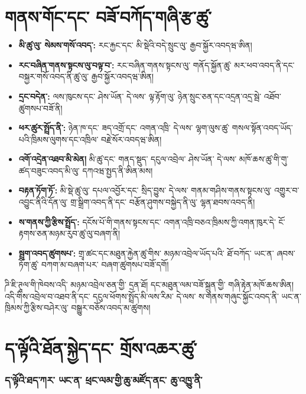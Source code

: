 \documentclass[11pt]{article}
\begin{document}
\section*{གནས་གོང་དང་ བཟོ་བཀོད་གཞི་རྩ་ཚུ་}

\begin{itemize}[leftmargin=*]
\item \textbf{མི་ཚུ་ལུ་ སེམས་གསོ་འབད་:} རང་རྐྱང་དང་ མི་སྡེའི་བདེ་སྲུང་ལུ་ རྒྱབ་སྐྱོར་འབདཝ་ཨིན།
\item \textbf{རང་བཞིན་གནས་སྟངས་ལུ་བལྟ་བ་:} རང་བཞིན་གནས་སྟངས་ལུ་ གནོད་སྐྱོན་ཚུ་ མར་ཕབ་འབད་ནི་དང་ བསྐྱར་གསོ་འབད་ནི་ཚུ་ལུ་ རྒྱབ་སྐྱོར་འབདཝ་ཨིན།
\item \textbf{དྲང་བདེན་:} ལས་ཁུངས་དང་ ཤེས་ཡོན་ དེ་ལས་ ལྟ་རྟོག་ལུ་ ཉེན་སྲུང་ཅན་དང་འདྲན་འདྲ་སྦེ་ འཐོབ་ཚུགསཔ་བཟོ་ནི།
\item \textbf{ཕར་ཚུར་སྤྲོད་ནི་:} ཉེན་ཁ་དང་ ཟད་འགྲོ་དང་ འགན་འཁྲི་ དེ་ལས་ ལྷག་ལུས་ཚུ་ གསལ་སྟོན་འབད་ཡོད་པའི་ཁྲིམས་ལུགས་དང་འཁྲིལ་ བརྗེ་སོར་འབདཝ་ཨིན།
\item \textbf{འགོ་འདྲེན་འཐབ་མི་མེན།} མི་ཚུ་དང་ གནད་སྡུད་ དངུལ་འབྲེལ་ ཤེས་ཡོན་ དེ་ལས་ མཁོ་ཆས་ཚུ་གི་གུ་ ཚད་བཟུང་འབད་མི་ལུ་ དཀའཝ་སྤྱད་ནི་ཨིན་མས།
\item \textbf{བརྟན་ཏོག་ཏོ་:} མི་སྡེ་ཚུ་ལུ་ དཔལ་འབྱོར་དང་ སྲིད་བྱུས་ དེ་ལས་ གནམ་གཤིས་གནས་སྟངས་ལུ་ འགྱུར་བ་འབྱུང་ནིའི་དོན་ལུ་ གྲ་སྒྲིག་འབད་ནི་དང་ བརྩོན་ཤུགས་བསྐྱེད་ནི་ལུ་ ལྷན་ཐབས་འབད་ནི།
\item \textbf{ས་གནས་ཀྱི་རྩིས་སྤྲོད་:} དངོས་པོ་གི་གནས་སྟངས་དང་ འགན་འཁྲི་བཅའ་ཁྲིམས་ཀྱི་འགན་ཁུར་དེ་ ངོ་རྟགས་ཅན་མཉམ་རུབ་ཚུ་ལུ་བཞག་ནི།
\item \textbf{སྦྲག་འབད་ཚུགསཔ་:} གྲྭ་ཚང་དང་མཐུན་རྐྱེན་ཚུ་གིས་ མཉམ་འབྲེལ་ཡོད་པའི་ ཐོ་བཀོད་ ཡང་ན་ ཞབས་ཏོག་ཚུ་ བཀག་མ་བཞག་པར་ བཞག་ཚུགསཔ་བཟོ་དགོ།
\end{itemize}
ཌི་ཇི་ཊཱལ་གི་ཁེབས་འདི་ མཉམ་འབྲེལ་ཅན་གྱི་ དྲན་ཐོ། དང་མཐུན་ལམ་བཟོ་སྐྲུན་གྱི་ གཞི་རྟེན་མཁོ་ཆས་ཨིན། འདི་གིས་འབྲེལ་བ་འཐབ་ནི་དང་ དངུལ་ཕོགས་སྤྲོད་མི་ལས་རིམ་ དེ་ལས་ ས་གནས་གཞུང་སྐྱོང་འབད་ནི་ ཡང་ན་ ཁྲིམས་ཀྱི་རྩིས་བཤེར་ལུ་ བསྒྱུར་བཅོས་འབད་མ་ཚུགས།

\section*{ད་ལྟོའི་ཐོན་སྐྱེད་དང་ གྲོས་འཆར་ཚུ་}

\subsubsection*{ད་ལྟོའི་ཐད་ཀར་ ཡང་ན་ ཕྲང་ལམ་གྱི་ཆུ་མཛོད་ནང་ ཆུ་འཁྱུ་ནི་}
\end{document}
